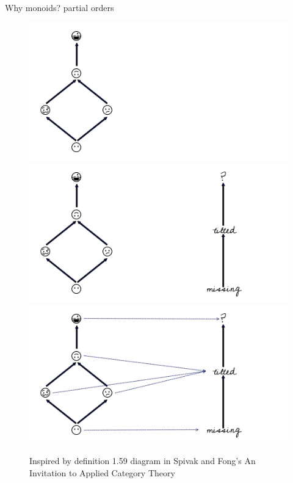 \documentclass[xcolor={dvipsnames}, handout]{beamer}
\begin{document}
\begin{frame}{Why monoids? partial orders}
    \begin{figure}
        \begin{overprint}
            \includegraphics[width=1\linewidth]{figures/math/monoid_hasse.png}
            \includegraphics[width=1\linewidth]{figures/math/monoid_monotone.png}
            \includegraphics[width=1\linewidth]{figures/math/monoid_maps.png}
        \end{overprint}
    \caption{Inspired by definition 1.59 diagram in Spivak and Fong's An Invitation to Applied Category Theory \cite{fongInvitationAppliedCategory2019}}
    \end{figure}
\end{frame}
\end{document}

